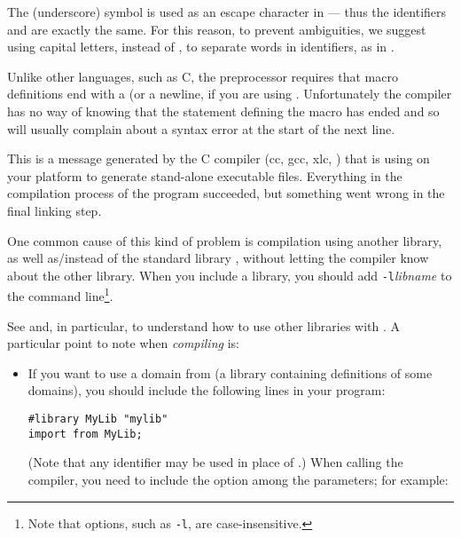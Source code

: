 
The \ttin{\_} (underscore) symbol is used as an escape character in
\asharp{} --- thus the identifiers  and
 are exactly the same.
 For this reason, to prevent ambiguities, we suggest using capital
letters, instead of \ttin{\_}, to separate words in identifiers, as in
.


Unlike other languages, such as C, the \asharp{} preprocessor requires
that macro definitions end with a \ttin{;} (or a newline, if you are
using .  Unfortunately the compiler has no way of knowing
that the statement defining the macro has ended and so will usually complain
about a syntax error at the start of the next line.


This is a message generated by the C compiler (cc, gcc, xlc, \etc{}) that
\asharp{} is using on your platform to generate stand-alone executable
files. 
Everything in the compilation process of the \asharp{} program succeeded, but
something went wrong in the final linking step.

One common cause of this kind of problem is compilation using another
library, as well as/instead of the standard \asharp{} library
\libaldor{}, without letting the compiler know about the other
library.
%
%
When you include a  library, you should add
\verb"-l"{\em libname} to the command line\footnote{Note that \asharp{}
options, such as {\tt -l}, are case-insensitive.}.

See  and, in particular, 
 to understand how to use other libraries with
\asharp{}.  A particular point to note when {\em compiling} is:
\begin{itemize}
\item If you want to use a domain from  (a library containing
definitions of some domains), you should include the following lines
in your \asharp{} program:

{\small
\begin{verbatim}
#library MyLib "mylib"
import from MyLib;
\end{verbatim}
}

(Note that any identifier may be used in place of .)
When calling the compiler, you need to include the 
option among the parameters; for example:

\osprompt {}
\end{itemize}


